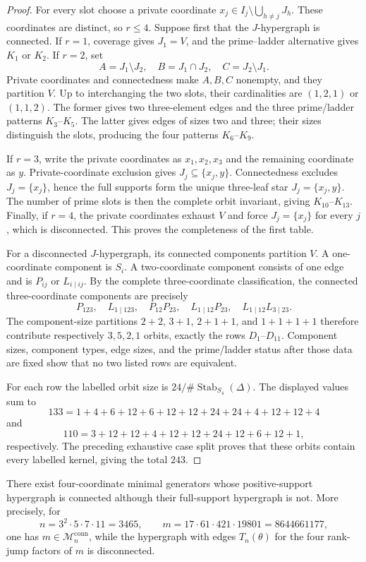 \begin{proof}
For every slot choose a private coordinate
$x_j\in I_j\setminus\bigcup_{h\ne j}J_h$.  These coordinates are distinct,
so $r\le4$.  Suppose first that the $J$-hypergraph is connected.  If $r=1$,
coverage gives $J_1=V$, and the prime--ladder alternative gives $K_1$ or
$K_2$.  If $r=2$, set
\[
 A=J_1\setminus J_2,
 \quad B=J_1\cap J_2,
 \quad C=J_2\setminus J_1.
\]
Private coordinates and connectedness make $A,B,C$ nonempty, and they
partition $V$.  Up to interchanging the two slots, their cardinalities are
$(1,2,1)$ or $(1,1,2)$.  The former gives two three-element edges and the
three prime/ladder patterns $K_3$--$K_5$.  The latter gives edges of sizes two
and three; their sizes distinguish the slots, producing the four patterns
$K_6$--$K_9$.

If $r=3$, write the private coordinates as $x_1,x_2,x_3$ and the remaining
coordinate as $y$.  Private-coordinate exclusion gives
$J_j\subseteq\{x_j,y\}$.  Connectedness excludes $J_j=\{x_j\}$, hence the
full supports form the unique three-leaf star
$J_j=\{x_j,y\}$.  The number of prime slots is then the complete orbit
invariant, giving $K_{10}$--$K_{13}$.  Finally, if $r=4$, the private
coordinates exhaust $V$ and force $J_j=\{x_j\}$ for every $j$, which is
disconnected.  This proves the completeness of the first table.

For a disconnected $J$-hypergraph, its connected components partition $V$.
A one-coordinate component is $S_i$.  A two-coordinate component consists of
one edge and is $P_{ij}$ or $L_{i\mid ij}$.  By the complete
three-coordinate classification, the connected three-coordinate components
are precisely
\[
 P_{123},\quad L_{1\mid123},\quad P_{12}P_{23},\quad
 L_{1\mid12}P_{23},\quad L_{1\mid12}L_{3\mid23}.
\]
The component-size partitions $2+2$, $3+1$, $2+1+1$, and $1+1+1+1$
therefore contribute respectively $3,5,2,1$ orbits, exactly the rows
$D_1$--$D_{11}$.  Component sizes, component types, edge sizes, and the
prime/ladder status after those data are fixed show that no two listed rows
are equivalent.

For each row the labelled orbit size is
$24/\#\operatorname{Stab}_{S_4}(\Delta)$.  The displayed values sum to
\[
 133=1+4+6+12+6+12+12+24+24+4+12+12+4
\]
and
\[
 110=3+12+12+4+12+12+24+12+6+12+1,
\]
respectively.  The preceding exhaustive case split proves that these orbits
contain every labelled kernel, giving the total $243$.
\end{proof}

\begin{proposition}
\label{prop:four-coordinate-support-separation}
There exist four-coordinate minimal generators whose positive-support
hypergraph is connected although their full-support hypergraph is not.  More
precisely, for
\[
 n=3^2\cdot5\cdot7\cdot11=3465,
 \qquad
 m=17\cdot61\cdot421\cdot19801=8644661177,
\]
one has $m\in\mathcal M_n^{\mathrm{conn}}$, while the hypergraph with edges
$T_n(\theta)$ for the four rank-jump factors of $m$ is disconnected.
\end{proposition}

